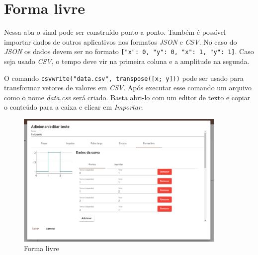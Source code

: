 \newpage{}
\section{Forma livre}%
\label{sec:free-form}

Nessa aba o sinal pode ser construído ponto a ponto. Também é possível importar
dados de outros aplicativos nos formatos \textit{JSON} e \textit{CSV}. No caso
do \textit{JSON} os dados devem ser no formato \texttt{[{"x": 0,
"y": 0}, {"x": 1, "y": 1}]}. Caso seja usado \textit{CSV}, o tempo deve vir na
primeira coluna e a amplitude na segunda.

O comando \texttt{csvwrite("data.csv", transpose([x; y]))} pode ser
usado para transformar vetores de valores em \textit{CSV}. Após executar esse
comando um arquivo como o nome \textit{data.csv} será criado. Basta abri-lo com
um editor de texto e copiar o conteúdo para a caixa e clicar em
\textit{Importar}.

\begin{figure}[ht!]
    \centering
    \includegraphics[width=0.9\textwidth]{imgs/system-response7}
    \caption[Forma livre]{Forma livre}%
    \label{fig:system-response7}
\end{figure}

